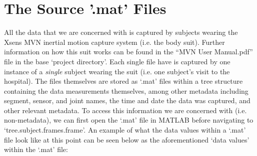 \documentclass[12pt,twoside]{report}
\begin{document}
\section{The Source '.mat' Files}

\quad All the data that we are concerned with is captured by subjects wearing the Xsens MVN inertial motion capture system (i.e. the body suit). Further information on how this suit works can be found in the “MVN User Manual.pdf” file in the base ‘project directory’. Each single file have is captured by one instance of a \textit{single} subject wearing the suit (i.e. one subject’s visit to the hospital). The files themselves are stored as ‘.mat’ files within a tree structure containing the data measurements themselves, among other metadata including segment, sensor, and joint names, the time and date the data was captured, and other relevant metadata. To access this information we are concerned with (i.e. non-metadata), we can first open the ‘.mat’ file in MATLAB before navigating to ‘tree.subject.frames.frame’. An example of what the data values within a ‘.mat’ file look like at this point can be seen below as the aforementioned ‘data values’ within the ‘.mat’ file:
\end{document}
